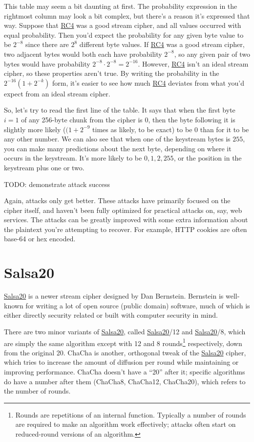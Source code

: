 \documentclass[11pt,ebook,table,dvipsnames]{memoir}
\begin{document}
This table may seem a bit daunting at first. The probability
expression in the rightmost column may look a bit complex, but there's
a reason it's expressed that way. Suppose that \hyperref[RC4]{RC4} was a good stream
cipher, and all values occurred with equal probability. Then you'd
expect the probability for any given byte value to be $2^{-8}$ since
there are $2^8$ different byte values. If \hyperref[RC4]{RC4} was a good stream
cipher, two adjacent bytes would both each have probability $2^{-8}$,
so any given pair of two bytes would have probability $2^{-8} \cdot
2^{-8} = 2^{-16}$. However, \hyperref[RC4]{RC4} isn't an ideal stream cipher, so these
properties aren't true. By writing the probability in the $2^{-16} (1 +
2^{-k})$ form, it's easier to see how much \hyperref[RC4]{RC4} deviates from what
you'd expect from an ideal stream cipher.

So, let's try to read the first line of the table. It says that when
the first byte $i = 1$ of any 256-byte chunk from the cipher is $0$,
then the byte following it is slightly more likely ($(1 + 2^{-9}$
times as likely, to be exact) to be 0 than for it to be any other
number. We can also see that when one of the keystream bytes is $255$,
you can make many predictions about the next byte, depending on where
it occurs in the keystream. It's more likely to be $0, 1, 2, 255$, or
the position in the keystream plus one or two.

TODO: demonstrate attack success

Again, attacks only get better. These attacks have primarily focused
on the cipher itself, and haven't been fully optimized for practical
attacks on, say, web services. The attacks can be greatly improved
with some extra information about the plaintext you're attempting to
recover. For example, HTTP cookies are often base-64 or hex encoded.
\section{\label{Salsa20}Salsa20}
\label{sec-2-3-12}

\hyperref[Salsa20]{Salsa20} is a newer \gls{stream cipher} designed by Dan Bernstein.
Bernstein is well-known for writing a lot of open source (public
domain) software, much of which is either directly security related
or built with computer security in mind.

There are two minor variants of \hyperref[Salsa20]{Salsa20}, called \hyperref[Salsa20]{Salsa20}/12 and
\hyperref[Salsa20]{Salsa20}/8, which are simply the same algorithm except with 12 and 8
rounds\footnote{Rounds are repetitions of an internal function. Typically a
number of rounds are required to make an algorithm work effectively;
attacks often start on reduced-round versions of an algorithm.}
respectively, down from the original 20. ChaCha is another, orthogonal
tweak of the \hyperref[Salsa20]{Salsa20} cipher, which tries to increase the amount of
diffusion per round while maintaining or improving performance. ChaCha
doesn't have a \enquote{20} after it; specific algorithms do have a number
after them (ChaCha8, ChaCha12, ChaCha20), which refers to the
number of rounds.
\end{document}
